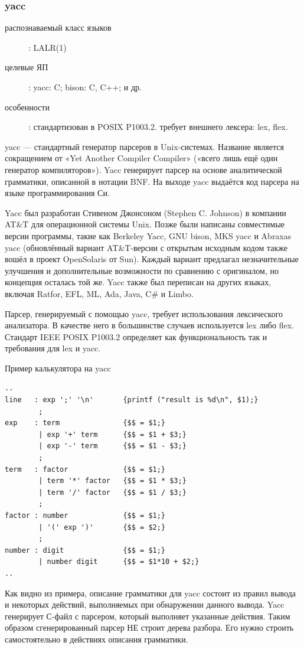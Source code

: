 \documentclass[a4paper,12pt,titlepage]{extarticle}
\begin{document}
\subsubsection*{yacc}
\begin{description}
  \item[распознаваемый класс языков]: LALR(1)
  \item[целевые ЯП]: yacc: C; bison: C, C++; и др.
  \item[особенности]: стандартизован в POSIX P1003.2. требует внешнего лексера: lex, flex.
\end{description}
yacc — стандартный генератор парсеров в Unix-системах. Название является
сокращением от «Yet Another Compiler Compiler» («всего лишь ещё один генератор
компиляторов»). Yacc генерирует парсер на основе аналитической грамматики,
описанной в нотации BNF. На выходе yacc выдаётся код парсера на языке
программирования Си.

Yacc был разработан Стивеном Джонсоном (Stephen C. Johnson) в компании AT\&T
для операционной системы Unix. Позже были написаны совместимые версии
программы, такие как Berkeley Yacc, GNU bison, MKS yacc и Abraxas yacc
(обновлённый вариант AT\&T-версии с открытым исходным кодом также вошёл в
проект OpenSolaris от Sun). Каждый вариант предлагал незначительные улучшения и
дополнительные возможности по сравнению с оригиналом, но концепция осталась той
же. Yacc также был переписан на других языках, включая Ratfor, EFL, ML, Ada,
Java, C\# и Limbo.

Парсер, генерируемый с помощью yacc, требует использования лексического
анализатора. В качестве него в большинстве случаев используется lex либо
flex. Стандарт IEEE POSIX P1003.2 определяет как функциональность так и
требования для lex и yacc.

Пример калькулятора на yacc
\begin{verbatim}
..
line   : exp ';' '\n'       {printf ("result is %d\n", $1);}
        ;
exp    : term               {$$ = $1;}
        | exp '+' term      {$$ = $1 + $3;}
        | exp '-' term      {$$ = $1 - $3;}
        ;
term   : factor             {$$ = $1;}
        | term '*' factor   {$$ = $1 * $3;}
        | term '/' factor   {$$ = $1 / $3;}
        ;
factor : number             {$$ = $1;}
        | '(' exp ')'       {$$ = $2;}
        ;
number : digit              {$$ = $1;}
        | number digit      {$$ = $1*10 + $2;}
..
\end{verbatim}

Как видно из примера, описание грамматики для yacc состоит из правил вывода и
некоторых действий, выполняемых при обнаружении данного вывода.
Yacc генерирует С-файл с парсером, который выполняет указанные действия.
Таким образом сгенерированный парсер НЕ строит дерева разбора. Его нужно строить
самостоятельно в действиях описания грамматики.
\end{document}
